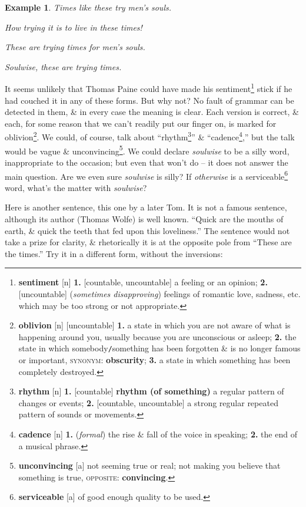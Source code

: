 \documentclass[oneside]{book}
\numberwithin{equation}{section}
\newtheorem{example}{Example}[chapter]
\begin{document}
\begin{example}
	Times like these try men's souls.
	
	How trying it is to live in these times!
	
	These are trying times for men's souls.
	
	Soulwise, these are trying times.
\end{example}
It seems unlikely that Thomas Paine could have made his sentiment\footnote{\textbf{sentiment} [n] \textbf{1.} [countable, uncountable] a feeling or an opinion; \textbf{2.} [uncountable] (\textit{sometimes disapproving}) feelings of romantic love, sadness, etc. which may be too strong or not appropriate.} stick if he had couched it in any of these forms. But why not? No fault of grammar can be detected in them, \& in every case the meaning is clear. Each version is correct, \& each, for some reason that we can't readily put our finger on, is marked for oblivion\footnote{\textbf{oblivion} [n] [uncountable] \textbf{1.} a state in which you are not aware of what is happening around you, usually because you are unconscious or asleep; \textbf{2.} the state in which somebody\texttt{/}something has been forgotten \& is no longer famous or important, \textsc{synonym}: \textbf{obscurity}; \textbf{3.} a state in which something has been completely destroyed.}. We could, of course, talk about ``rhythm\footnote{\textbf{rhythm} [n] \textbf{1.} [countable] \textbf{rhythm (of something)} a regular pattern of changes or events; \textbf{2.} [countable, uncountable] a strong regular repeated pattern of sounds or movements.}'' \& ``cadence\footnote{\textbf{cadence} [n] \textbf{1.} (\textit{formal}) the rise \& fall of the voice in speaking; \textbf{2.} the end of a musical phrase.},'' but the talk would be vague \& unconvincing\footnote{\textbf{unconvincing} [a] not seeming true or real; not making you believe that something is true, \textsc{opposite}: \textbf{convincing}.}. We could declare \textit{soulwise} to be a silly word, inappropriate to the occasion; but even that won't do -- it does not answer the main question. Are we even sure \textit{soulwise} is silly? If \textit{otherwise} is a serviceable\footnote{\textbf{serviceable} [a] of good enough quality to be used.} word, what's the matter with \textit{soulwise}?

Here is another sentence, this one by a later Tom. It is not a famous sentence, although its author (Thomas Wolfe) is well known. ``Quick are the mouths of earth, \& quick the teeth that fed upon this loveliness.'' The sentence would not take a prize for clarity, \& rhetorically it is at the opposite pole from ``These are the times.'' Try it in a different form, without the inversions:
\end{document}
